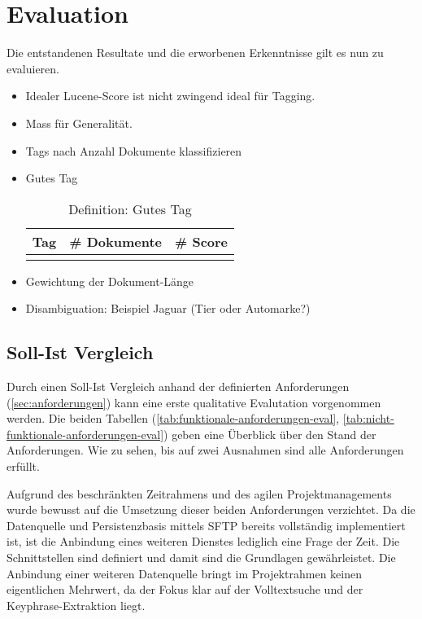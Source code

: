 \chapter{Evaluation}

Die entstandenen Resultate und die erworbenen Erkenntnisse gilt es nun zu evaluieren.

\begin{itemize}
    \item Idealer Lucene-Score ist nicht zwingend ideal für Tagging.
    \item Mass für Generalität.
    \item Tags nach Anzahl Dokumente klassifizieren
    \item Gutes Tag
    
    \begin{longtable}{|p{4cm}| p{4cm}| p{4cm}|}
  \hline
    \textbf{Tag} & \textbf{\# Dokumente}& \textbf{\# Score}\\\hline
        \caption{Definition: Gutes Tag}
    \label{gutes-tag}
\end{longtable}
    \item Gewichtung der Dokument-Länge
    \item Disambiguation: Beispiel Jaguar (Tier oder Automarke?)
    
\end{itemize}

\section{Soll-Ist Vergleich}

Durch einen Soll-Ist Vergleich anhand der definierten Anforderungen (\autoref{sec:anforderungen}) kann eine erste qualitative Evalutation vorgenommen werden. Die beiden Tabellen (\autoref{tab:funktionale-anforderungen-eval}, \autoref{tab:nicht-funktionale-anforderungen-eval}) geben eine Überblick über den Stand der Anforderungen. Wie zu sehen, bis auf zwei Ausnahmen sind alle Anforderungen erfüllt. 

Aufgrund des beschränkten Zeitrahmens und des agilen Projektmanagements wurde bewusst auf die Umsetzung dieser beiden Anforderungen verzichtet. Da die Datenquelle und Persistenzbasis mittels \gls{SFTP} bereits vollständig implementiert ist, ist die Anbindung eines weiteren Dienstes lediglich eine Frage der Zeit. Die Schnittstellen sind definiert und damit sind die Grundlagen gewährleistet. Die Anbindung einer weiteren Datenquelle bringt im Projektrahmen keinen eigentlichen Mehrwert, da der Fokus klar auf der Volltextsuche und der \gls{Keyphrase}-Extraktion liegt.

